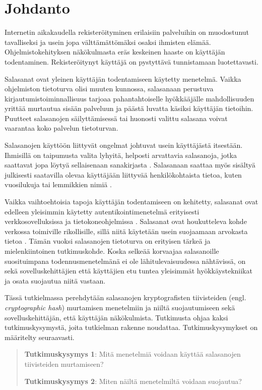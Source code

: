 \chapter{Johdanto\label{ch:johdanto}}

Internetin aikakaudella rekisteröityminen erilaisiin palveluihin on muodostunut tavalliseksi ja usein jopa välttämättömäksi osaksi ihmisten elämää. Ohjelmistokehityksen näkökulmasta eräs keskeinen haaste on käyttäjän todentaminen. Rekisteröitynyt käyttäjä on pystyttävä tunnistamaan luotettavasti.

Salasanat ovat yleinen käyttäjän todentamiseen käytetty menetelmä. Vaikka ohjelmiston tietoturva olisi muuten kunnossa, salasanaan perustuva kirjautumistoiminnallisuus tarjoaa pahantahtoiselle hyökkääjälle mahdollisuuden yrittää murtautua sisään palveluun ja päästä luvatta käsiksi käyttäjän tietoihin. Puutteet salasanojen säilyttämisessä tai huonosti valittu salasana voivat vaarantaa koko palvelun tietoturvan.

Salasanojen käyttöön liittyvät ongelmat johtuvat usein käyttäjästä itsestään. Ihmisillä on taipumusta valita lyhyitä, helposti arvattavia salasanoja, jotka saattavat jopa löytyä sellaisenaan sanakirjasta \citep{shen_user_2016}. Salasanaan saattaa myös sisältyä julkisesti saatavilla olevaa käyttäjään liittyvää henkilökohtaista tietoa, kuten vuosilukuja tai lemmikkien nimiä \citep{bosnjak_brute-force_2018}.

Vaikka vaihtoehtoisia tapoja käyttäjän todentamiseen on kehitetty, salasanat ovat edelleen yleisimmin käytetty autentikointimenetelmä erityisesti verkkosovelluksissa ja tietokoneohjelmissa \citep{zimmermann_password_2020}. Salasanat ovat houkutteleva kohde verkossa toimiville rikollisille, sillä niitä käytetään usein suojaamaan arvokasta tietoa \citep{shen_user_2016}. Tämän vuoksi salasanojen tietoturva on erityisen tärkeä ja mielenkiintoinen tutkimuskohde. Koska selkeää korvaajaa salasanoille suosituimpana todennusmenetelmänä ei ole lähitulevaisuudessa nähtävissä, on sekä sovelluskehittäjien että käyttäjien etu tuntea yleisimmät hyökkäystekniikat ja osata suojautua niitä vastaan.

Tässä tutkielmassa perehdytään salasanojen kryptografisten tiivisteiden (engl. \textit{cryptographic hash}) murtamisen menetelmiin ja niiltä suojautumiseen sekä sovelluskehittäjän, että käyttäjän näkökulmista. Tutkimusta ohjaa kaksi tutkimuskysymystä, joita tutkielman rakenne noudattaa. Tutkimuskysymykset on määritelty seuraavasti.

\begin{quote}
    \textbf{Tutkimuskysymys 1\label{rq1}}: Mitä menetelmiä voidaan käyttää salasanojen tiivisteiden murtamiseen?
    
    \textbf{Tutkimuskysymys 2\label{rq2}}: Miten näiltä menetelmiltä voidaan suojautua?
\end{quote}

